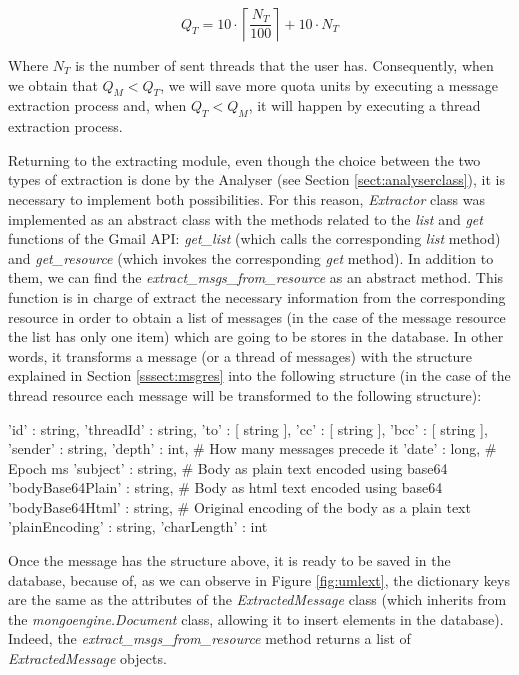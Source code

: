 $$
Q_T = 10\cdot\left\lceil\frac{N_T}{100}\right\rceil+10\cdot N_T
$$

Where $N_T$ is the number of sent threads that the user has. Consequently, when we obtain that $Q_M < Q_T$, we will save more quota units by executing a message extraction process and, when $Q_T < Q_M$, it will happen by executing a thread extraction process.

Returning to the extracting module, even though the choice between the two types of extraction is done by the Analyser (see Section \ref{sect:analyserclass}), it is necessary to implement both possibilities. For this reason, \textit{Extractor} class was implemented as an abstract class with the methods related to the \textit{list} and \textit{get} functions of the Gmail API: \textit{get\_list} (which calls the corresponding \textit{list} method) and \textit{get\_resource} (which invokes the corresponding \textit{get} method). In addition to them, we can find the \textit{extract\_msgs\_from\_resource} as an abstract method. This function is in charge of extract the necessary information from the corresponding resource in order to obtain a list of messages (in the case of the message resource the list has only one item) which are going to be stores in the database. In other words, it transforms a message (or a thread of messages) with the structure explained in Section \ref{sssect:msgres} into the following structure (in the case of the thread resource each message will be transformed to the following structure):

\begin{python}
{
	'id' : string,
	'threadId' : string,
	'to' : [ string ],
	'cc' : [ string ],
	'bcc' : [ string ],
	'sender' : string,
	'depth' : int,               # How many messages precede it
	'date' : long,               # Epoch ms
	'subject' : string,
	# Body as plain text encoded using base64
	'bodyBase64Plain' : string,
	# Body as html text encoded using base64
	'bodyBase64Html' : string,
	# Original encoding of the body as a plain text
	'plainEncoding' : string,    
	'charLength' : int
}
\end{python}

Once the message has the structure above, it is ready to be saved in the database, because of, as we can observe in Figure \ref{fig:umlext}, the dictionary keys are the same as the attributes of the \textit{ExtractedMessage} class (which inherits from the \textit{mongoengine.Document} class, allowing it to insert elements in the database). Indeed, the \textit{extract\_msgs\_from\_resource} method returns a list of \textit{ExtractedMessage} objects.

